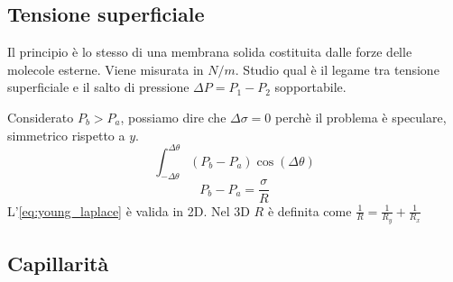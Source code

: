 
\subsection{Tensione superficiale}
Il principio è lo stesso di una membrana solida costituita dalle forze delle molecole esterne.
Viene misurata in $ \unit{N/m} $. Studio qual è il legame tra tensione superficiale e il salto di pressione $ \Delta P=P_1 -P_2 $ sopportabile.
\begin{figure}[H]
  \centering
  \caption{}
  \label{fig:membrana}
\end{figure}
Considerato $ P_b >P_a $, possiamo dire che $ \Delta\sigma =0$ perchè il problema è speculare, simmetrico rispetto a $ y $.
\begin{equation*}
  \label{eq:young_laplace_calc}
  \int_{-\Delta \theta}^{\Delta \theta} (P_b-P_a) \cos(\Delta \theta  ) 
\end{equation*}
\begin{equation}
  \label{eq:young_laplace}
 P_b-P_a = \frac{\sigma}{R} 
\end{equation}
L'\cref{eq:young_laplace} è valida in 2D. Nel 3D $ R $ è definita come $ \frac{1}{R}=\frac{1}{R_y}+\frac{1}{R_x} $\\

\subsection{Capillarità}

